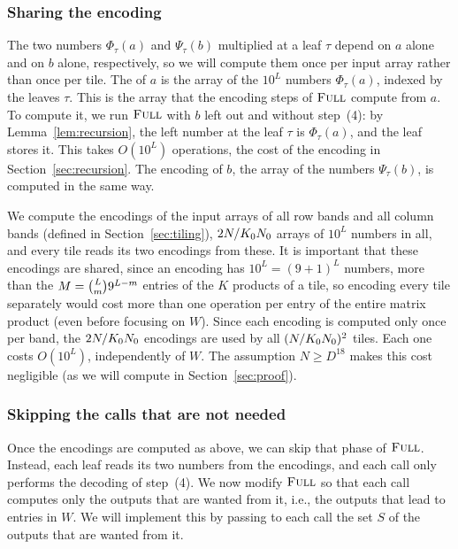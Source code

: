 \subsubsection{Sharing the encoding}\label{sec:encoders}

The two numbers $\Phi_\tau(a)$ and $\Psi_\tau(b)$ multiplied at a leaf $\tau$ depend on $a$ alone and on $b$ alone, respectively, so we will compute them once per input array rather than once per tile. The  of $a$ is the array of the $10^L$ numbers $\Phi_\tau(a)$, indexed by the leaves $\tau$. This is the array that the encoding steps of $\textnormal{\textsc{Full}}$ compute from $a$. To compute it, we run $\textnormal{\textsc{Full}}$ with $b$ left out and without step~(4): by Lemma~\ref{lem:recursion}, the left number at the leaf $\tau$ is $\Phi_\tau(a)$, and the leaf stores it. This takes $O(10^L)$ operations, the cost of the encoding in Section~\ref{sec:recursion}. The encoding of $b$, the array of the numbers $\Psi_\tau(b)$, is computed in the same way.

We compute the encodings of the input arrays of all row bands and all column bands (defined in Section~\ref{sec:tiling}), $2N/K_0N_0$ arrays of $10^L$ numbers in all, and every tile reads its two encodings from these. It is important that these encodings are shared, since an encoding has $10^L=(9+1)^L$ numbers, more than the $M=\binom Lm9^{L-m}$ entries of the $K$ products of a tile, so encoding every tile separately would cost more than one operation per entry of the entire matrix product (even before focusing on $W$). Since each encoding is computed only once per band, the $2N/K_0N_0$ encodings are used by all $(N/K_0N_0)^2$ tiles. Each one costs $O(10^L)$, independently of $W$. The assumption $N\ge D^{18}$ makes this cost negligible (as we will compute in Section~\ref{sec:proof}). 

\subsubsection{Skipping the calls that are not needed}\label{sec:prune}

Once the encodings are computed as above, we can skip that phase of $\textnormal{\textsc{Full}}$. Instead, each leaf reads its two numbers from the encodings, and each call only performs the decoding of step~(4). We now modify $\textnormal{\textsc{Full}}$ so that each call computes only the outputs that are wanted from it, i.e., the outputs that lead to entries in $W$. We will implement this by passing to each call the set $S$ of the outputs that are wanted from it.

